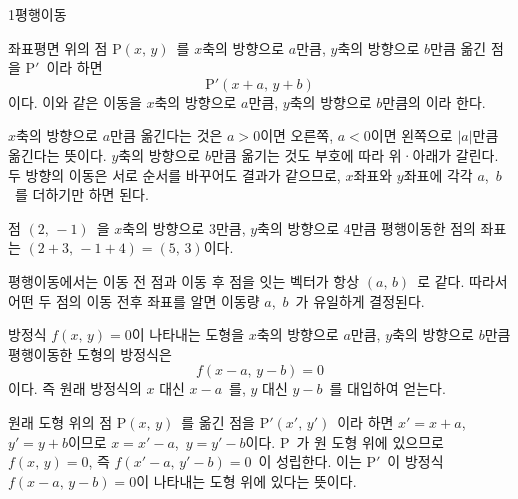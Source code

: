 \documentclass[10pt]{article}
\begin{document}

\begin{dmconcept}{1}{평행이동}
\setlength{\parskip}{2.0mm plus 2.1mm minus 0mm}\linespread{1.30}\selectfont%


좌표평면 위의 점 $\mathrm{P}(x,\, y)$\ 를 $x$축의 방향으로 $a$만큼, $y$축의 방향으로 $b$만큼 옮긴 점을 $\mathrm{P}'$\ 이라 하면
\begin{equation*}
  \mathrm{P}'(x + a,\, y + b)
\end{equation*}
이다. 이와 같은 이동을 $x$축의 방향으로 $a$만큼, $y$축의 방향으로 $b$만큼의 이라 한다.

\begin{dmexplain}
$x$축의 방향으로 $a$만큼 옮긴다는 것은 $a > 0$이면 오른쪽, $a < 0$이면 왼쪽으로 $|a|$만큼 옮긴다는 뜻이다. $y$축의 방향으로 $b$만큼 옮기는 것도 부호에 따라 위·아래가 갈린다. 두 방향의 이동은 서로 순서를 바꾸어도 결과가 같으므로, $x$좌표와 $y$좌표에 각각 $a$,\ $b$\ 를 더하기만 하면 된다.
\end{dmexplain}

\begin{dmexample}
점 $(2,\, -1)$\ 을 $x$축의 방향으로 $3$만큼, $y$축의 방향으로 $4$만큼 평행이동한 점의 좌표는 $(2 + 3,\, -1 + 4) = (5,\, 3)$이다.
\end{dmexample}

\begin{dmnote}
평행이동에서는 이동 전 점과 이동 후 점을 잇는 벡터가 항상 $(a,\, b)$\ 로 같다. 따라서 어떤 두 점의 이동 전후 좌표를 알면 이동량 $a$,\ $b$\ 가 유일하게 결정된다.
\end{dmnote}


방정식 $f(x,\, y) = 0$이 나타내는 도형을 $x$축의 방향으로 $a$만큼, $y$축의 방향으로 $b$만큼 평행이동한 도형의 방정식은
\begin{equation*}
  f(x - a,\, y - b) = 0
\end{equation*}
이다. 즉 원래 방정식의 $x$ 대신 $x - a$\ 를, $y$ 대신 $y - b$\ 를 대입하여 얻는다.

\begin{dmexplain}
원래 도형 위의 점 $\mathrm{P}(x,\, y)$\ 를 옮긴 점을 $\mathrm{P}'(x',\, y')$\ 이라 하면 $x' = x + a$,\ $y' = y + b$이므로 $x = x' - a$,\ $y = y' - b$이다. $\mathrm{P}$\ 가 원 도형 위에 있으므로 $f(x,\, y) = 0$, 즉 $f(x' - a,\, y' - b) = 0$\ 이 성립한다. 이는 $\mathrm{P}'$\ 이 방정식 $f(x - a,\, y - b) = 0$이 나타내는 도형 위에 있다는 뜻이다.
\end{dmexplain}


\end{dmconcept}
\end{document}
